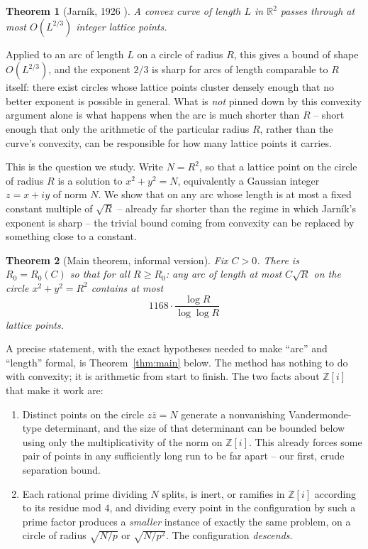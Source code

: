 \documentclass[11pt]{amsart}
\newtheorem*{theorem*}{Theorem}
\theoremstyle{definition}
\theoremstyle{remark}
\newcommand{\Z}{\mathbb{Z}}
\newcommand{\R}{\mathbb{R}}
\begin{document}
\begin{theorem*}[Jarn\'{i}k, 1926 \cite{Jarnik1926}]
A convex curve of length $L$ in $\R^2$ passes through at most $O(L^{2/3})$ integer lattice points.
\end{theorem*}

Applied to an arc of length $L$ on a circle of radius $R$, this gives a bound of shape $O(L^{2/3})$, and the exponent $2/3$ is sharp for arcs of length comparable to $R$ itself: there exist circles whose lattice points cluster densely enough that no better exponent is possible in general. What is \emph{not} pinned down by this convexity argument alone is what happens when the arc is much shorter than $R$ -- short enough that only the arithmetic of the particular radius $R$, rather than the curve's convexity, can be responsible for how many lattice points it carries.

This is the question we study. Write $N=R^2$, so that a lattice point on the circle of radius $R$ is a solution to $x^2+y^2=N$, equivalently a Gaussian integer $z=x+iy$ of norm $N$. We show that on any arc whose length is at most a fixed constant multiple of $\sqrt{R}$ -- already far shorter than the regime in which Jarn\'{i}k's exponent is sharp -- the trivial bound coming from convexity can be replaced by something close to a constant.

\begin{theorem*}[Main theorem, informal version]
Fix $C>0$. There is $R_0=R_0(C)$ so that for all $R\ge R_0$: any arc of length at most $C\sqrt{R}$ on the circle $x^2+y^2=R^2$ contains at most
\[
1168\cdot\frac{\log R}{\log\log R}
\]
lattice points.
\end{theorem*}

A precise statement, with the exact hypotheses needed to make ``arc'' and ``length'' formal, is Theorem~\ref{thm:main} below. The method has nothing to do with convexity; it is arithmetic from start to finish. The two facts about $\Z[i]$ that make it work are:

\begin{enumerate}[label=(\roman*)]
\item Distinct points on the circle $z\bar z = N$ generate a nonvanishing Vandermonde-type determinant, and the size of that determinant can be bounded below using only the multiplicativity of the norm on $\Z[i]$. This already forces some pair of points in any sufficiently long run to be far apart -- our first, crude separation bound.
\item Each rational prime dividing $N$ splits, is inert, or ramifies in $\Z[i]$ according to its residue mod $4$, and dividing every point in the configuration by such a prime factor produces a \emph{smaller} instance of exactly the same problem, on a circle of radius $\sqrt{N/p}$ or $\sqrt{N/p^2}$. The configuration \emph{descends}.
\end{enumerate}
\end{document}
